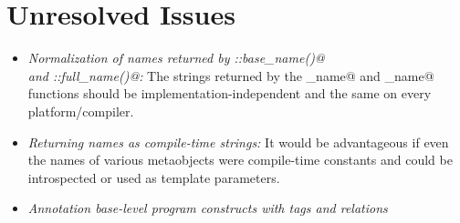 \section{Unresolved Issues}

\begin{itemize}
	\item {\em Normalization of names returned by \verb@Named::base_name()@\\and \verb@Named::full_name()@:}
	The strings returned by the \verb@base_name@ and \verb@full_name@ functions should be
	implementation-independent and the same on every platform/compiler.
	
	\item {\em Returning names as compile-time strings:} It would be advantageous if even
	the names of various metaobjects were compile-time constants and could be introspected
	or used as template parameters.

	\item {\em Annotation base-level program constructs with tags and relations}
\end{itemize}
